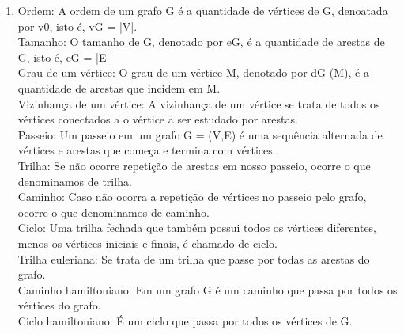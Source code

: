\documentclass[11pt,reqno]{amsart}
\begin{document}
\begin{enumerate}
\item Ordem: A ordem de um grafo G é a quantidade de vértices de G, denoatada por v0, isto é, vG = |V|.\\ Tamanho: O tamanho de G, denotado por eG, é a quantidade de arestas de G, isto é, eG = |E|\\ Grau de um vértice: O grau de um vértice M, denotado por dG (M), é a quantidade de arestas que incidem em M.\\ Vizinhança de um vértice: A vizinhança de um vértice se trata de todos os vértices conectados a o vértice a ser estudado por arestas.\\ Passeio: Um passeio em um grafo G = (V,E) é uma sequência alternada de vértices e arestas que começa e termina com vértices.\\ Trilha: Se não ocorre repetição de arestas em nosso passeio, ocorre o que denominamos de trilha.\\ Caminho: Caso não ocorra a repetição de vértices no passeio pelo grafo, ocorre o que denominamos de caminho.\\ Ciclo: Uma trilha fechada que também possui todos os vértices diferentes, menos os vértices iniciais e finais, é chamado de ciclo.\\ Trilha euleriana: Se trata de um trilha que passe por todas as arestas do grafo.\\ Caminho hamiltoniano: Em um grafo G é um caminho que passa por todos os vértices do grafo.\\ Ciclo hamiltoniano: É um ciclo que passa por todos os vértices de G.
\vspace{0.3cm}




\end{enumerate}
\end{document}
